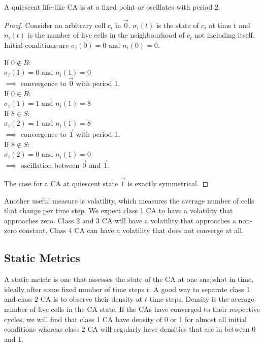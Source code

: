 \begin{lemma}
A quiescent life-like CA is at a fixed point or oscillates with period 2.   
\end{lemma}

\begin{proof} \label{quiescent-nullity}
Consider an arbitrary cell $c_i$ in $\vec{0}$. $\sigma_i(t)$ is the state of $c_i$ at time t and $n_i(t)$ is the number of live cells in the neighbourhood of $c_i$ not including itself. Initial conditions are $\sigma_i(0) = 0 \text{\ and\ } n_i(0) = 0$.
\begin{multicols}{2}
\noindent If $0 \notin B$:\\
\null \quad $\sigma_i(1) = 0 \text{\ and\ } n_i(1) = 0 $\\
\null \quad $\implies$ convergence to $\vec{0}$ with period 1.\\
\columnbreak\linebreak
\noindent If $0 \in B$:\\
\null \quad $\sigma_i(1) = 1 \text{\ and\ } n_i(1) = 8 $\\
\null \quad If $8 \in S$:\\
\null \qquad $\sigma_i(2) = 1 \text{\ and\ } n_i(1) = 8 $\\
\null \qquad $\implies$ convergence to $\vec{1}$ with period 1.\\
\null \quad If $8 \notin S$:\\
\null \qquad $\sigma_i(2) = 0 \text{\ and\ } n_i(1) = 0 $\\
\null \qquad $\implies$ oscillation between $\vec{0}$ and $\vec{1}$.
\end{multicols}
\noindent The case for a CA at quiescent state $\vec{1}$ is exactly symmetrical.
\end{proof}


Another useful measure is volatility, which measures the average number of cells that change per time step. We expect class 1 CA to have a volatility that approaches zero. Class 2 and 3 CA will have a volatility that approaches a non-zero constant. Class 4 CA can have a volatility that does not converge at all.\\

\subsection{Static Metrics} 

A static metric is one that assesses the state of the CA at one snapshot in time, ideally after some fixed number of time steps $t$.
A good way to separate class 1 and class 2 CA is to observe their density at $t$ time steps. Density is the average number of live cells in the CA state. If the CAs have converged to their respective cycles, we will find that class 1 CA have density of 0 or 1 for almost all initial conditions whereas class 2 CA will regularly have densities that are in between 0 and 1.\\

